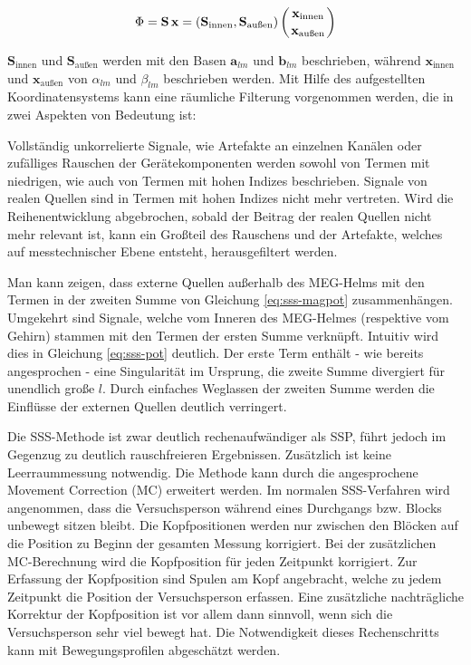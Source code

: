 \documentclass[doc,a4paper,12pt]{apa6}
\newcommand{\mx}[1]{\mathbf{#1}}
\begin{document}
\begin{equation}
\Phi = \mx{S}\,\mx{x} = \left( \mx{S}_{\text{innen}}, \mx{S}_{\text{außen}} \right) \left( \mx{x}_{\text{innen}} \atop \mx{x}_{\text{außen}} \right)
\end{equation}

$\mx{S}_{\text{innen}}$ und $\mx{S}_{\text{außen}}$ werden mit den Basen $\mx{a}_{lm}$ und $\mx{b}_{lm}$ beschrieben, während $\mx{x}_{\text{innen}}$ und $\mx{x}_{\text{außen}}$ von $\alpha_{lm}$ und $\beta_{lm}$ beschrieben werden. Mit Hilfe des aufgestellten Koordinatensystems kann eine räumliche Filterung vorgenommen werden, die in zwei Aspekten von Bedeutung ist:

\begin{compactitem}
\item Vollständig unkorrelierte Signale, wie Artefakte an einzelnen Kanälen oder zufälliges Rauschen der Gerätekomponenten werden sowohl von Termen mit niedrigen, wie auch von Termen mit hohen Indizes beschrieben. Signale von realen Quellen sind in Termen mit hohen Indizes nicht mehr vertreten. Wird die Reihenentwicklung abgebrochen, sobald der Beitrag der realen Quellen nicht mehr relevant ist, kann ein Großteil des Rauschens und der Artefakte, welches auf messtechnischer Ebene entsteht, herausgefiltert werden.
\item Man kann zeigen, dass externe Quellen außerhalb des MEG-Helms mit den Termen in der zweiten Summe von Gleichung \ref{eq:sss-magpot} zusammenhängen. Umgekehrt sind Signale, welche vom Inneren des MEG-Helmes (respektive vom Gehirn) stammen mit den Termen der ersten Summe verknüpft. Intuitiv wird dies in Gleichung \ref{eq:sss-pot} deutlich. Der erste Term enthält - wie bereits angesprochen - eine Singularität im Ursprung, die zweite Summe divergiert für unendlich große $l$. Durch einfaches Weglassen der zweiten Summe werden die Einflüsse der externen Quellen deutlich verringert.
\end{compactitem}

Die SSS-Methode ist zwar deutlich rechenaufwändiger als SSP, führt jedoch im Gegenzug zu deutlich rauschfreieren Ergebnissen. Zusätzlich ist keine Leerraummessung notwendig. Die Methode kann durch die angesprochene Movement Correction (MC) erweitert werden. Im normalen SSS-Verfahren wird angenommen, dass die Versuchsperson während eines Durchgangs bzw. Blocks unbewegt sitzen bleibt. Die Kopfpositionen werden nur zwischen den Blöcken auf die Position zu Beginn der gesamten Messung korrigiert. Bei der zusätzlichen MC-Berechnung wird die Kopfposition für jeden Zeitpunkt korrigiert. Zur Erfassung der Kopfposition sind Spulen am Kopf angebracht, welche zu jedem Zeitpunkt die Position der Versuchsperson erfassen. Eine zusätzliche nachträgliche Korrektur der Kopfposition ist vor allem dann sinnvoll, wenn sich die Versuchsperson sehr viel bewegt hat. Die Notwendigkeit dieses Rechenschritts kann mit Bewegungsprofilen abgeschätzt werden.
\end{document}
